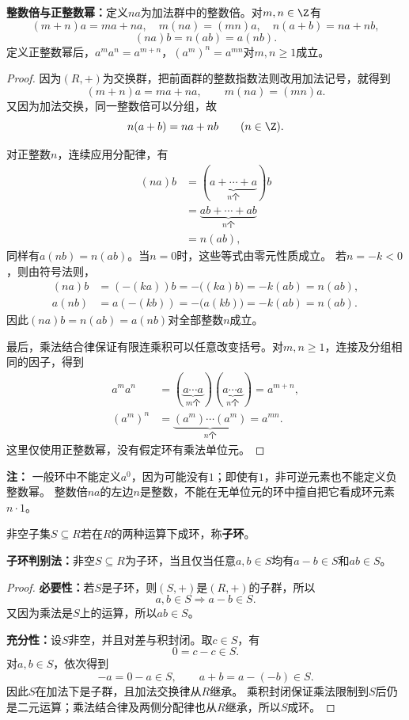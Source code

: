\begin{proposition}
\textbf{整数倍与正整数幂：}定义$na$为加法群中的整数倍。对$m,n\in\Z$有
\[
(m+n)a=ma+na,\quad m(na)=(mn)a,\quad n(a+b)=na+nb,
\]
\[
(na)b=n(ab)=a(nb).
\]
定义正整数幂后，$a^ma^n=a^{m+n}$，$(a^m)^n=a^{mn}$对$m,n\geq1$成立。
\end{proposition}
\begin{proof}
因为$(R,+)$为交换群，把前面群的整数指数法则改用加法记号，就得到
\[
(m+n)a=ma+na,\qquad m(na)=(mn)a.
\]
又因为加法交换，同一整数倍可以分组，故
\[
n(a+b)=na+nb\qquad(n\in\Z).
\]

对正整数$n$，连续应用分配律，有
\[
\begin{aligned}
(na)b
&=(\underbrace{a+\cdots+a}_{n\text{个}})b\\
&=\underbrace{ab+\cdots+ab}_{n\text{个}}\\
&=n(ab),
\end{aligned}
\]
同样有$a(nb)=n(ab)$。当$n=0$时，这些等式由零元性质成立。
若$n=-k<0$，则由符号法则，
\[
\begin{aligned}
(na)b&=(-(ka))b=-\bigl((ka)b\bigr)=-k(ab)=n(ab),\\
a(nb)&=a(-(kb))=-\bigl(a(kb)\bigr)=-k(ab)=n(ab).
\end{aligned}
\]
因此$(na)b=n(ab)=a(nb)$对全部整数$n$成立。

最后，乘法结合律保证有限连乘积可以任意改变括号。对$m,n\geq1$，连接及分组相同的因子，得到
\[
\begin{aligned}
a^ma^n
&=(\underbrace{a\cdots a}_{m\text{个}})(\underbrace{a\cdots a}_{n\text{个}})
=a^{m+n},\\
(a^m)^n
&=\underbrace{(a^m)\cdots(a^m)}_{n\text{个}}
=a^{mn}.
\end{aligned}
\]
这里仅使用正整数幂，没有假定环有乘法单位元。
\end{proof}
\textbf{注：}
一般环中不能定义$a^0$，因为可能没有$1$；即使有$1$，非可逆元素也不能定义负整数幂。
整数倍$na$的左边$n$是整数，不能在无单位元的环中擅自把它看成环元素$n\cdot1$。


\begin{definition}
非空子集$S\subseteq R$若在$R$的两种运算下成环，称\textbf{子环}。
\end{definition}
\begin{theorem}
\textbf{子环判别法：}非空$S\subseteq R$为子环，当且仅当任意$a,b\in S$均有$a-b\in S$和$ab\in S$。
\end{theorem}
\begin{proof}
\textbf{必要性：}若$S$是子环，则$(S,+)$是$(R,+)$的子群，所以
\[
a,b\in S\Longrightarrow a-b\in S.
\]
又因为乘法是$S$上的运算，所以$ab\in S$。

\textbf{充分性：}设$S$非空，并且对差与积封闭。取$c\in S$，有
\[
0=c-c\in S.
\]
对$a,b\in S$，依次得到
\[
-a=0-a\in S,\qquad a+b=a-(-b)\in S.
\]
因此$S$在加法下是子群，且加法交换律从$R$继承。
乘积封闭保证乘法限制到$S$后仍是二元运算；乘法结合律及两侧分配律也从$R$继承，所以$S$成环。
\end{proof}

